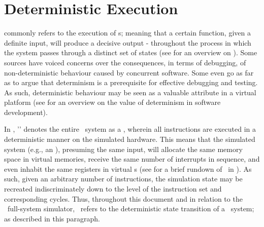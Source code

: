 \section*{Deterministic Execution}
\label{sec:appendixa_deterministicexecution}

 commonly refers to the execution of \dvttermdeterministicalgorithm s; meaning that a certain function, given a definite input, will produce a decisive output - throughout the process in which the system passes through a distinct set of states (see  for an overview on ).
Some sources have voiced concerns over the consequences, in terms of debugging, of non-deterministic behaviour caused by concurrent software.
Some even go as far as to argue that determinism is a prerequisite for effective debugging and testing.
As such, deterministic behaviour may be seen as a valuable attribute in a virtual platform (see  for an overview on the value of determinism in software development).

In \dvttermsimics , '\dvttermdeterministicexecution ' denotes the entire \dvttermtarget\ system as a \dvttermdeterministicalgorithm , wherein all instructions are executed in a deterministic manner on the simulated hardware.
This means that the simulated system (e.g., an \dvttermos ), presuming the same input, will allocate the same memory space in virtual memories, receive the same number of interrupts in sequence, and even inhabit the same registers in virtual \dvttermcpu s (see  for a brief rundown of \dvttermdeterministicexecution\ in \dvttermsimics ).
As such, given an arbitrary number of instructions, the simulation state may be recreated indiscriminately down to the level of the instruction set and corresponding cycles.
Thus, throughout this document and in relation to the \dvttermsimics\ full-system simulator, \dvttermdeterministicexecution\ refers to the deterministic state transition of a \dvttermtarget\ system; as described in this paragraph.

